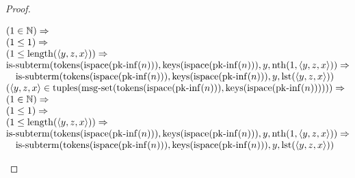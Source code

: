\documentclass[11pt]{article}
\theoremstyle{plain}
\begin{document}
\begin{proof}
\begin{itemize}[leftmargin=2.8em, itemsep=4pt, parsep=1pt]
\begin{itemize}[leftmargin=2.8em, itemsep=4pt, parsep=1pt]
\begin{equation*}
\begin{array}{@{}l@{}}
\begin{array}{@{}l@{}} (1 \in \mathbb{N}) \Rightarrow  \\ (1 \leq 1) \Rightarrow  \\ (1 \leq \operatorname{length}(\langle y, z, x \rangle)) \Rightarrow  \\ \operatorname{is\text{-}subterm}(\operatorname{tokens}(\operatorname{ispace}(\operatorname{pk\text{-}inf}(n))), \operatorname{keys}(\operatorname{ispace}(\operatorname{pk\text{-}inf}(n))), y, \operatorname{nth}(1, \langle y, z, x \rangle)) \Rightarrow  \\ \quad \operatorname{is\text{-}subterm}(\operatorname{tokens}(\operatorname{ispace}(\operatorname{pk\text{-}inf}(n))), \operatorname{keys}(\operatorname{ispace}(\operatorname{pk\text{-}inf}(n))), y, \operatorname{lst}(\langle y, z, x \rangle)) \end{array} \\
\begin{array}{@{}l@{}} (\langle y, z, x \rangle \in \operatorname{tuples}(\operatorname{msg\text{-}set}(\operatorname{tokens}(\operatorname{ispace}(\operatorname{pk\text{-}inf}(n))), \operatorname{keys}(\operatorname{ispace}(\operatorname{pk\text{-}inf}(n)))))) \Rightarrow  \\ (1 \in \mathbb{N}) \Rightarrow  \\ (1 \leq 1) \Rightarrow  \\ (1 \leq \operatorname{length}(\langle y, z, x \rangle)) \Rightarrow  \\ \operatorname{is\text{-}subterm}(\operatorname{tokens}(\operatorname{ispace}(\operatorname{pk\text{-}inf}(n))), \operatorname{keys}(\operatorname{ispace}(\operatorname{pk\text{-}inf}(n))), y, \operatorname{nth}(1, \langle y, z, x \rangle)) \Rightarrow  \\ \quad \operatorname{is\text{-}subterm}(\operatorname{tokens}(\operatorname{ispace}(\operatorname{pk\text{-}inf}(n))), \operatorname{keys}(\operatorname{ispace}(\operatorname{pk\text{-}inf}(n))), y, \operatorname{lst}(\langle y, z, x \rangle)) \end{array} \\

\end{array}
\end{equation*}
\end{itemize}
\end{itemize}
\end{proof}
\end{document}
